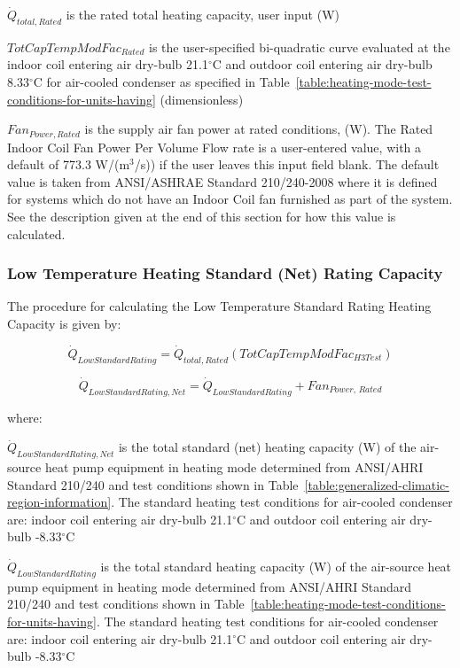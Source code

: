\({\dot Q_{total,Rated}}\) is the rated total heating capacity, user input (W)

\(TotCapTempModFa{c_{Rated}}\) is the user-specified bi-quadratic curve evaluated at the indoor coil entering air dry-bulb 21.1\(^{\circ}\)C and outdoor coil entering air dry-bulb 8.33\(^{\circ}\)C for air-cooled condenser as specified in Table~\ref{table:heating-mode-test-conditions-for-units-having} (dimensionless)

\(Fa{n_{Power,Rated}}\) is the supply air fan power at rated conditions, (W). The Rated Indoor Coil Fan Power Per Volume Flow rate is a user-entered value, with a default of 773.3 W/(m\(^3\)/s)) if the user leaves this input field blank. The default value is taken from ANSI/ASHRAE Standard 210/240-2008 where it is defined for systems which do not have an Indoor Coil fan furnished as part of the system. See the description given at the end of this section for how this value is calculated.

\subsubsection{Low Temperature Heating Standard (Net) Rating Capacity}\label{low-temperature-heating-standard-net-rating-capacity}

The procedure for calculating the Low Temperature Standard Rating Heating Capacity is given by:

\begin{equation}
{\dot Q_{LowStandardRating}} = {\dot Q_{total,Rated}}\left( {TotCapTempModFa{c_{H3Test}}} \right)
\end{equation}

\begin{equation}
{\dot Q_{LowStandardRating,Net}} = {\dot Q_{LowStandardRating}} + Fa{n_{Power,\,Rated}}
\end{equation}

where:

\({\dot Q_{LowStandardRating,Net}}\) is the total standard (net) heating capacity (W) of the air-source heat pump equipment in heating mode determined from ANSI/AHRI Standard 210/240 and test conditions shown in Table~\ref{table:generalized-climatic-region-information}. The standard heating test conditions for air-cooled condenser are: indoor coil entering air dry-bulb 21.1\(^{\circ}\)C and outdoor coil entering air dry-bulb -8.33\(^{\circ}\)C

\({\dot Q_{LowStandardRating}}\) is the total standard heating capacity (W) of the air-source heat pump equipment in heating mode determined from ANSI/AHRI Standard 210/240 and test conditions shown in Table~\ref{table:heating-mode-test-conditions-for-units-having}. The standard heating test conditions for air-cooled condenser are: indoor coil entering air dry-bulb 21.1\(^{\circ}\)C and outdoor coil entering air dry-bulb -8.33\(^{\circ}\)C

